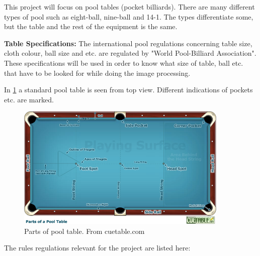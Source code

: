 This project will focus on pool tables (pocket billiards). There are many different types of pool such as eight-ball, nine-ball and 14-1. The types differentiate some, but the table and the rest of the equipment is the same.

\textbf{Table Specifications:}
The international pool regulations concerning table size, cloth colour, ball size and etc. are regulated by "World Pool-Billiard Association"\cite{poolregulations}. These specifications will be used in order to know what size of table, ball etc. that have to be looked for while doing the image processing.

In \ref{fig:partspool} a standard pool table is seen from top view. Different indications of pockets etc. are marked.

\begin{figure}[htpb]
\begin{center}
\leavevmode
\includegraphics[width=0.9\textwidth]{images/pooltablespecs.jpg}
\end{center}
\caption{Parts of pool table. From cuetable.com}
\label{fig:partspool}
\end{figure}

The rules regulations relevant for the project are listed here:

